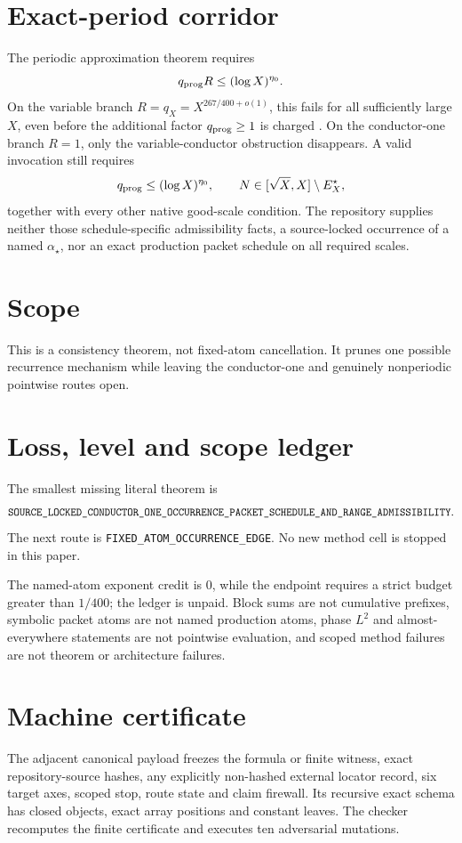 \documentclass[11pt]{article}
\begin{document}
\section{Exact-period corridor}
The periodic approximation theorem requires
\[
 q_{\rm prog}R\le(\log X)^{\eta_0}.
\]
On the variable branch \(R=q_X=X^{267/400+o(1)}\), this fails for all
sufficiently large \(X\), even before the additional factor
\(q_{\rm prog}\ge1\) is charged \citep{WangTPC157}.  On the conductor-one
branch \(R=1\), only the variable-conductor obstruction disappears.  A
valid invocation still requires
\[
 q_{\rm prog}\le(\log X)^{\eta_0},\qquad
 N\in[\sqrt X,X]\setminus E_X^\star,
\]
together with every other native good-scale condition.  The repository
supplies neither those schedule-specific admissibility facts, a
source-locked occurrence of a named \(\alpha_\star\), nor an exact
production packet schedule on all required scales.

\section{Scope}
This is a consistency theorem, not fixed-atom cancellation.  It prunes one
possible recurrence mechanism while leaving the conductor-one and genuinely
nonperiodic pointwise routes open.


\section{Loss, level and scope ledger}
The smallest missing literal theorem is
\[
\texttt{SOURCE\_\allowbreak{}LOCKED\_\allowbreak{}CONDUCTOR\_\allowbreak{}ONE\_\allowbreak{}OCCURRENCE\_\allowbreak{}PACKET\_\allowbreak{}SCHEDULE\_\allowbreak{}AND\_\allowbreak{}RANGE\_\allowbreak{}ADMISSIBILITY}.
\]
The next route is \texttt{FIXED\_\allowbreak{}ATOM\_\allowbreak{}OCCURRENCE\_\allowbreak{}EDGE}.
No new method cell is stopped in this paper.

The named-atom exponent credit is \(0\), while the endpoint requires a
strict budget greater than \(1/400\); the ledger is unpaid.  Block sums are
not cumulative prefixes, symbolic packet atoms are not named production
atoms, phase \(L^2\) and almost-everywhere statements are not pointwise
evaluation, and scoped method failures are not theorem or architecture
failures.

\section{Machine certificate}
The adjacent canonical payload freezes the formula or finite witness,
exact repository-source hashes, any explicitly non-hashed external locator
record, six target axes, scoped stop, route state and claim firewall.  Its
recursive exact schema has closed objects, exact array positions and
constant leaves.  The checker recomputes the finite certificate and executes
ten adversarial mutations.



\end{document}
